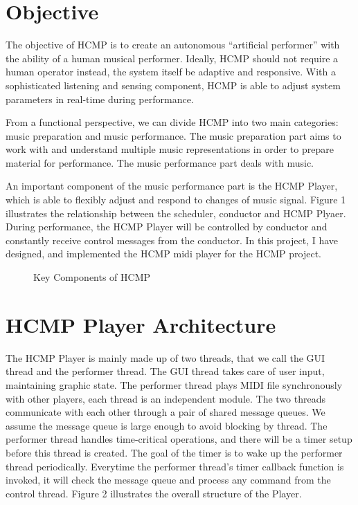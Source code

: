 \section{Objective}
The objective of HCMP \cite{Dawen:2011} is to create an autonomous 
``artificial performer'' with the ability of a human musical performer. 
Ideally, HCMP should not require a human operator instead, the system itself 
be adaptive and responsive. With a sophisticated listening and sensing
component, HCMP is able to adjust system parameters in real-time during 
performance. 

From a functional perspective, we can divide HCMP into two main
categories: music preparation and music performance. The music preparation
part aims to work with and understand multiple music representations in order
to prepare material for performance. The music
performance part deals with music.     

An important component of the music performance part is the HCMP Player, 
which is able to flexibly  
adjust and respond to changes of music signal. Figure 1 illustrates the relationship 
between the scheduler, conductor and HCMP Plyaer. During performance, the HCMP Player will 
be controlled by conductor and constantly receive control messages 
from the conductor. In this project, I have designed, and implemented the HCMP midi player 
for the HCMP project.
\begin{figure}[H] %
\caption{Key Components of HCMP}
\label{fig:speciation}
\end{figure}
 

\section{HCMP Player Architecture}
The HCMP Player is mainly made up of two threads, that we call the GUI thread 
and the performer thread. The GUI thread takes care of user input, maintaining 
graphic state. The performer thread plays MIDI file synchronously with other 
players, each thread is an independent 
module. The two threads communicate with each other through a pair of shared 
message queues. We assume the message 
queue is large enough to avoid blocking by thread. The performer thread
handles time-critical operations, and there will be a timer setup 
before this thread is created. The goal of the timer is to 
wake up the performer thread periodically. Everytime the performer 
thread's timer callback function is invoked, 
it will check the message queue and process any command from the control thread.
Figure 2 illustrates the overall structure of the Player.

